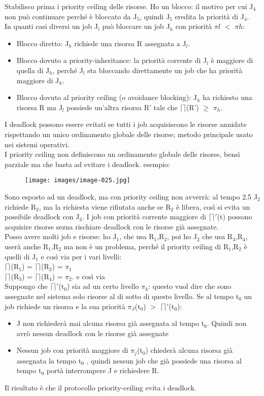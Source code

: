 \documentclass[12pt, oneside]{extbook}
\begin{document}
Stabilisco prima i priority ceiling delle risorse. Ho un blocco: il motivo per cui J$_{4}$ non può continuare perché è bloccato da J$_{5}$, quindi J$_{5}$ eredita la priorità di J$_{4}$.\\ In quanti casi diversi un job J$_{l}$ può bloccare un job J$_{h}$ con priorità $\pi{l}$ $<$ $\pi{h}$:
\begin{itemize}
\item Blocco diretto: J$_{h}$ richiede una risorsa R assegnata a J$_{l}$.
\item Blocco dovuto a priority-inheritance: la priorità corrente di J$_{l}$ è maggiore di quella di J$_{h}$, perché J$_{l}$ sta bloccando direttamente un job che ha priorità maggiore di J$_{h}$.
\item Blocco dovuto al priority ceiling (o avoidance blocking): J$_{h}$ ha richiesto una risorsa R ma J$_{l}$ possiede un'altra risorsa R' tale che $\lceil\rceil$(R') $\geq$ $\pi_{h}$.
\end{itemize}
I deadlock possono essere evitati se tutti i job acquisiscono le risorse annidate rispettando un unico ordinamento globale delle risorse; metodo principale usato nei sistemi operativi.\\ I priority ceiling non definiscono un ordinamento globale delle risorse, bensì parziale ma che basta ad evitare i deadlock. esempio:\\
\begin{figure}[!h]
\centering
\texttt{[image: images/image-025.jpg]}
\end{figure}
Sono esposto ad un deadlock, ma con priority ceiling non avverrà: al tempo 2.5 J$_{2}$ richiede R$_{2}$, ma la richiesta viene rifiutata anche se R$_{2}$ è libera, così si evita un possibile deadlock con J$_{3}$. I job con priorità corrente maggiore di $\lceil\rceil'$(t) possono acquisire risorse sezna rischiare deadlock con le risorse già assegnate.\\ Posso avere molti job e risorse: ho J$_{1}$, che usa R$_{1}$,R$_{2}$, poi ho J$_{2}$ che usa R$_{3}$,R$_{4}$, userà anche R$_{1}$,R$_{2}$ ma non è un problema, perché il priority ceiling di R$_{1}$,R$_{2}$ è quelli di J$_{1}$ e così via per i vari livelli:\\
$\lceil\rceil$(R$_{1}$) = $\lceil\rceil$(R$_{2}$) = $\pi_{1}$\\
$\lceil\rceil$(R$_{3}$) = $\lceil\rceil$(R$_{4}$) = $\pi_{2}$.
e così via \\ Suppongo che $\lceil\rceil'$(t$_{0}$) sia ad un certo livello $\pi_{k}$: questo vuol dire che sono assegnate nel sistema solo risorse al di sotto di questo livello. Se al tempo t$_{0}$ un job richiede un risorsa e la sua priorità $\pi_{J}$(t$_{0}$) $>$ $\lceil\rceil'$(t$_{0}$):
\begin{itemize}
\item J non richiederà mai alcuna risorsa già assegnata al tempo t$_{0}$. Quindi non avrò nessun deadlock con le risorse già assegnate
\item Nessun job con priorità maggiore di $\pi_{j}$(t$_{0}$) chiederà alcuna risorsa già assegnata la tempo t$_{0}$ , quindi nessun job che già possiede una risorsa al tempo t$_{0}$ portà interrompere J e richiedere R.
\end{itemize}
Il risultato è che il protocollo priority-ceiling evita i deadlock.
\end{document}
